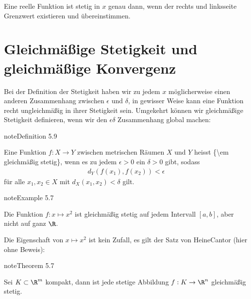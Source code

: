 \documentclass[letterpaper,10pt,english]{jupyterBook}
\begin{document}
Eine reelle Funktion ist stetig in \(x\) genau dann, wenn der rechts\sphinxhyphen{} und linksseite Grenzwert existieren und übereinstimmen.


\section{Gleichmäßige Stetigkeit und gleichmäßige Konvergenz}
\label{\detokenize{stetigkeit/glm:gleichmaszige-stetigkeit-und-gleichmaszige-konvergenz}}\label{\detokenize{stetigkeit/glm::doc}}
Bei der Definition der Stetigkeit haben wir zu jedem \(x\) möglicherweise einen anderen Zusammenhang zwischen \(\epsilon\) und \(\delta\), in gewisser Weise kann eine Funktion recht ungleichmäßig in ihrer Stetigkeit sein. Umgekehrt können wir gleichmäßige Stetigkeit definieren, wenn wir den \(\epsilon\)\sphinxhyphen{}\(\delta\) Zusammenhang global machen:
\label{stetigkeit/glm:definition-0}
\begin{sphinxadmonition}{note}{Definition 5.9}



Eine Funktion \(f: X\rightarrow Y\) zwischen metrischen Räumen \(X\) und \(Y\) heisst \{\textbackslash{}em gleichmäßig stetig\}, wenn es zu jedem \(\epsilon > 0\) ein \(\delta > 0\) gibt, sodass
\begin{equation*}
\begin{split} d_Y(f(x_1),f(x_2)) < \epsilon\end{split}
\end{equation*}
für alle \(x_1,x_2 \in X\) mit \(d_X(x_1,x_2) < \delta\) gilt.
\end{sphinxadmonition}
\label{stetigkeit/glm:example-1}
\begin{sphinxadmonition}{note}{Example 5.7}



Die Funktion \(f:x \mapsto x^2\) ist gleichmäßig stetig auf jedem Intervall \([a,b]\), aber nicht auf ganz \(\R\).
\end{sphinxadmonition}

Die Eigenschaft von \(x \mapsto x^2\) ist kein Zufall, es gilt der Satz von Heine\sphinxhyphen{}Cantor (hier ohne Beweis):
\label{stetigkeit/glm:theorem-2}
\begin{sphinxadmonition}{note}{Theorem 5.7}



Sei \(K \subset \R^m\) kompakt, dann ist jede stetige Abbildung \(f:K \rightarrow \R^n\) gleichmäßig stetig.
\end{sphinxadmonition}
\end{document}
